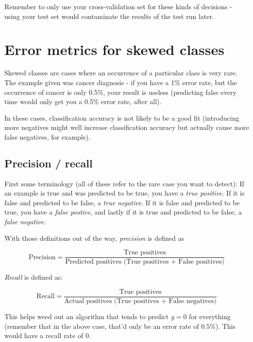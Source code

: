 Remember to only use your cross-validation set for these kinds of decisions - using your test set would contaminate the results of the test run later.

\section{Error metrics for skewed classes}

Skewed classes are cases where an occurrence of a particular class is very rare. The example given was cancer diagnosis - if you have a 1\% error rate, but the occurrence of cancer is only 0.5\%, your result is useless (predicting false every time would only get you a 0.5\% error rate, after all).

In these cases, classification accuracy is not likely to be a good fit (introducing more negatives might well increase classification accuracy but actually cause more false negatives, for example).	

\subsection{Precision / recall}

First some terminology (all of these refer to the rare case you want to detect): If an example is true and was predicted to be true, you have a \emph{true positive}. If it is false and predicted to be false, a \emph{true negative}. If it is false and predicted to be true, you have a \emph{false postive}, and lastly if it is true and predicted to be false, a \emph{false negative}.

With those definitions out of the way, \emph{precision} is defined as 

\begin{equation}
\textrm{Precision} = \frac{\textrm{True positives}}
{\textrm{Predicted positives (True positives + False positives)}}
\end{equation}

\emph{Recall} is defined as:

\begin{equation}
\textrm{Recall} = \frac{\textrm{True positives}}
{\textrm{Actual positives (True positives + False negatives)}}
\end{equation}

This helps weed out an algorithm that tends to predict $y = 0$ for everything (remember that in the above case, that'd only be an error rate of 0.5\%). This would have a recall rate of 0.

